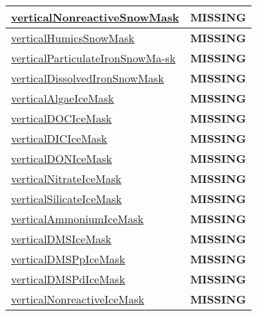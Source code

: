 {\begin{center}
\begin{longtable}{| p{2.0in} | p{4.0in} |}
    \hline
    \hyperref[subsec:var_sec_tracer_masks_verticalNonreactiveSnowMask]{verticalNonreactiveSnowMask} & {\bf \color{red} MISSING} \\
    \hline
    \hyperref[subsec:var_sec_tracer_masks_verticalHumicsSnowMask]{verticalHumicsSnowMask} & {\bf \color{red} MISSING} \\
    \hline
    \hyperref[subsec:var_sec_tracer_masks_verticalParticulateIronSnowMask]{verticalParticulateIronSnowMa-}\hyperref[subsec:var_sec_tracer_masks_verticalParticulateIronSnowMask]{sk  }& {\bf \color{red} MISSING} \\
    \hline
    \hyperref[subsec:var_sec_tracer_masks_verticalDissolvedIronSnowMask]{verticalDissolvedIronSnowMask} & {\bf \color{red} MISSING} \\
    \hline
    \hyperref[subsec:var_sec_tracer_masks_verticalAlgaeIceMask]{verticalAlgaeIceMask} & {\bf \color{red} MISSING} \\
    \hline
    \hyperref[subsec:var_sec_tracer_masks_verticalDOCIceMask]{verticalDOCIceMask} & {\bf \color{red} MISSING} \\
    \hline
    \hyperref[subsec:var_sec_tracer_masks_verticalDICIceMask]{verticalDICIceMask} & {\bf \color{red} MISSING} \\
    \hline
    \hyperref[subsec:var_sec_tracer_masks_verticalDONIceMask]{verticalDONIceMask} & {\bf \color{red} MISSING} \\
    \hline
    \hyperref[subsec:var_sec_tracer_masks_verticalNitrateIceMask]{verticalNitrateIceMask} & {\bf \color{red} MISSING} \\
    \hline
    \hyperref[subsec:var_sec_tracer_masks_verticalSilicateIceMask]{verticalSilicateIceMask} & {\bf \color{red} MISSING} \\
    \hline
    \hyperref[subsec:var_sec_tracer_masks_verticalAmmoniumIceMask]{verticalAmmoniumIceMask} & {\bf \color{red} MISSING} \\
    \hline
    \hyperref[subsec:var_sec_tracer_masks_verticalDMSIceMask]{verticalDMSIceMask} & {\bf \color{red} MISSING} \\
    \hline
    \hyperref[subsec:var_sec_tracer_masks_verticalDMSPpIceMask]{verticalDMSPpIceMask} & {\bf \color{red} MISSING} \\
    \hline
    \hyperref[subsec:var_sec_tracer_masks_verticalDMSPdIceMask]{verticalDMSPdIceMask} & {\bf \color{red} MISSING} \\
    \hline
    \hyperref[subsec:var_sec_tracer_masks_verticalNonreactiveIceMask]{verticalNonreactiveIceMask} & {\bf \color{red} MISSING} \\

\end{longtable}
\end{center}}
